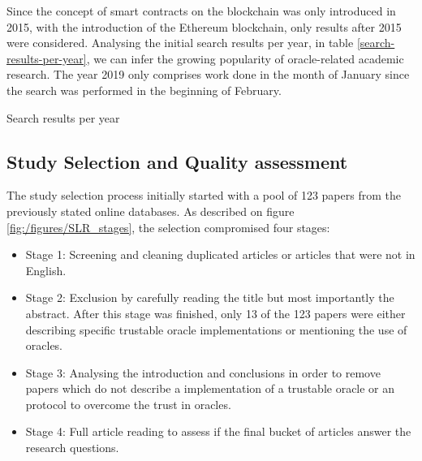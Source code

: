 Since the concept of smart contracts on the blockchain was only introduced in 2015, with the introduction of the Ethereum blockchain, only results after 2015 were considered. Analysing the initial search results per year, in table \ref{search-results-per-year}, we can infer the growing popularity of oracle-related academic research. The year 2019 only comprises work done in the month of January since the search was performed in the beginning of February.

\begin{table}[H]
\centering
{}
\caption{Search results per year}
\label{search-results-per-year}
\end{table}


\subsection{Study Selection and Quality assessment}

The study selection process initially started with a pool of 123 papers from the previously stated online databases. As described on figure \ref{fig:/figures/SLR_stages}, the selection compromised four stages:
\begin{itemize}
\item Stage 1: Screening and cleaning duplicated articles or articles that were not in English.
\item Stage 2: Exclusion by carefully reading the title but most importantly the abstract. After this stage was finished, only 13 of the 123 papers were either describing specific trustable oracle implementations or mentioning the use of oracles.
\item Stage 3: Analysing the introduction and conclusions in order to remove papers which do not describe a implementation of a trustable oracle or an protocol to overcome the trust in oracles.
\item Stage 4: Full article reading to assess if the final bucket of articles answer the research questions.
\end{itemize}


